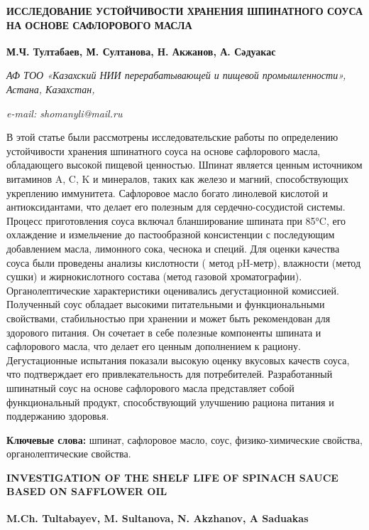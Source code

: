 \begin{articleheader}
{\bfseries ИССЛЕДОВАНИЕ УСТОЙЧИВОСТИ ХРАНЕНИЯ ШПИНАТНОГО СОУСА НА ОСНОВЕ
САФЛОРОВОГО МАСЛА}

{\bfseries
М.Ч. Тултабаев\textsuperscript{\envelope },
М. Султанова,
Н. Акжанов,
А. Сәдуакас}
\end{articleheader}

\begin{affiliation}
\emph{АФ ТОО «Казахский НИИ перерабатывающей и пищевой промышленности», Астана, Казахстан,}

\emph{e-mail: shomanyli@mail.ru}
\end{affiliation}

В этой статье были рассмотрены исследовательские работы по определению
устойчивости хранения шпинатного соуса на основе сафлорового масла,
обладающего высокой пищевой ценностью. Шпинат является ценным источником
витаминов A, C, K и минералов, таких как железо и магний, способствующих
укреплению иммунитета. Сафлоровое масло богато линолевой кислотой и
антиоксидантами, что делает его полезным для сердечно-сосудистой
системы. Процесс приготовления соуса включал бланширование шпината при
85°C, его охлаждение и измельчение до пастообразной консистенции с
последующим добавлением масла, лимонного сока, чеснока и специй. Для
оценки качества соуса были проведены анализы кислотности ( метод
pH-метр), влажности (метод сушки) и жирнокислотного состава (метод
газовой хроматографии). Органолептические характеристики оценивались
дегустационной комиссией. Полученный соус обладает высокими питательными
и функциональными свойствами, стабильностью при хранении и может быть
рекомендован для здорового питания. Он сочетает в себе полезные
компоненты шпината и сафлорового масла, что делает его ценным
дополнением к рациону. Дегустационные испытания показали высокую оценку
вкусовых качеств соуса, что подтверждает его привлекательность для
потребителей. Разработанный шпинатный соус на основе сафлорового масла
представляет собой функциональный продукт, способствующий улучшению
рациона питания и поддержанию здоровья.

{\bfseries Ключевые слова:} шпинат, сафлоровое масло, соус,
физико-химические свойства, органолептические свойства.

\begin{articleheader}
{\bfseries INVESTIGATION OF THE SHELF LIFE OF SPINACH SAUCE BASED ON SAFFLOWER OIL}

{\bfseries
M.Ch. Tultabayev\textsuperscript{\envelope },
M. Sultanova,
N. Akzhanov,
A Saduakas}
\end{articleheader}

